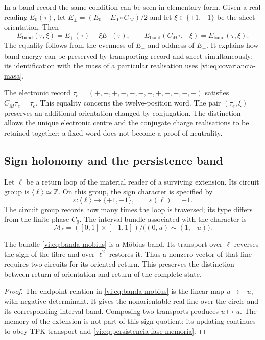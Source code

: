 In a band record the same condition can be seen in elementary
form. Given a real reading $E_0(\tau)$, let
$E_\pm=(E_0\pm E_0\circ C_M)/2$ and let $\xi\in\{+1,-1\}$
be the sheet orientation. Then
\begin{equation}
 E_{\mathrm{band}}(\tau,\xi)=E_+(\tau)+\xi E_-(\tau),\qquad
 E_{\mathrm{band}}(C_M\tau,-\xi)=E_{\mathrm{band}}(\tau,\xi).
 \label{vi:eq:banda-paridad}
\end{equation}
The equality follows from the evenness of $E_+$ and oddness of $E_-$.
It explains how band energy can be preserved by transporting
record and sheet simultaneously; its identification with the mass of a
particular realisation uses \eqref{vi:eq:covariancia-masa}.

The electronic record
$\tau_e=(+,+,+,-,-,-,+,+,+,-,-,-)$ satisfies $C_M\tau_e=\tau_e$.
This equality concerns the twelve-position word. The pair
$(\tau_e,\xi)$ preserves an additional orientation changed by
conjugation. The distinction allows the unique electronic
centre and the conjugate charge realisations to be retained together;
a fixed word does not become a proof of neutrality.

\subsection{Sign holonomy and the persistence band}
\label{vi:subsec:mobius}

Let $\ell$ be a return loop of the material reader of a surviving
extension. Its circuit group is $\langle\ell\rangle\simeq
\mathbb Z$. On this group, the sign character is specified by
\begin{equation}
 \varepsilon:\langle\ell\rangle\longrightarrow\{+1,-1\},
 \qquad \varepsilon(\ell)=-1.
 \label{vi:eq:holonomia-signo}
\end{equation}
The circuit group records how many times the loop is traversed; its
type differs from the finite phase $C_9$. The interval bundle
associated with the character is
\begin{equation}
 \mathcal M_\ell=([0,1]\times[-1,1])/
                  \bigl((0,u)\sim(1,-u)\bigr).
 \label{vi:eq:banda-mobius}
\end{equation}

\begin{theorem}
\label{vi:thm:retorno-mobius}
The bundle \eqref{vi:eq:banda-mobius} is a Möbius band.
Its transport over $\ell$ reverses the sign of the fibre and over
$\ell^2$ restores it. Thus a nonzero vector of that line
requires two circuits for its oriented return. This preserves the
distinction between return of orientation and return of the complete state.
\end{theorem}
\begin{proof}
The endpoint relation in \eqref{vi:eq:banda-mobius} is the linear
map $u\mapsto-u$, with negative determinant. It gives the nonorientable
real line over the circle and its corresponding interval
band. Composing two transports produces $u\mapsto u$.
The memory of the extension is not part of this sign quotient;
its updating continues to obey TPK transport and
\eqref{vi:eq:persistencia-fase-memoria}.
\end{proof}

